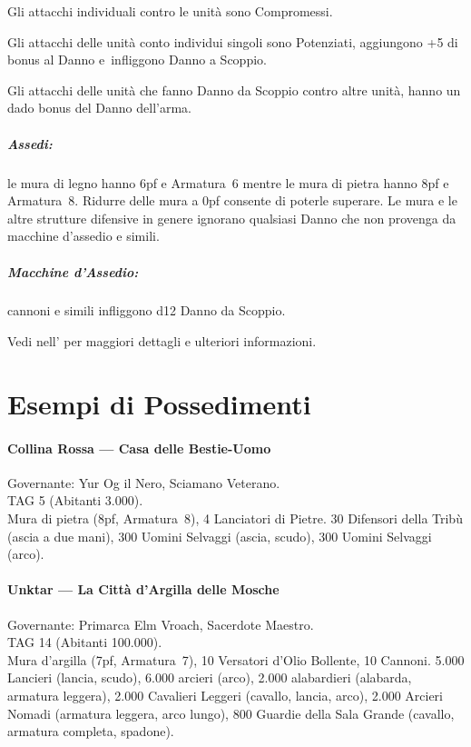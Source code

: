 \documentclass[itdr]{subfiles}
\begin{document}
Gli attacchi individuali contro le unità sono Compromessi.

Gli attacchi delle unità conto individui singoli sono Potenziati, aggiungono +5 di bonus al Danno e~infliggono Danno a Scoppio.

Gli attacchi delle unità che fanno Danno da Scoppio contro altre unità, hanno un dado bonus del Danno dell’arma.

\subparagraph{Assedi:} le mura di legno hanno 6pf e Armatura~6 mentre le mura di pietra hanno 8pf e Armatura~8. Ridurre delle mura a 0pf consente di poterle superare. Le mura e le altre strutture difensive in genere ignorano qualsiasi Danno che non provenga da macchine d’assedio e simili.

\subparagraph{Macchine d’Assedio:} cannoni e simili infliggono d12 Danno da Scoppio.

\begin{dbox}
	Vedi \textbf{} nell'\textbf{} per maggiori dettagli e ulteriori informazioni.
\end{dbox}

\vfill

\section{Esempi di Possedimenti}

\paragraph{Collina Rossa --- Casa delle Bestie-Uomo}
Governante: Yur Og il Nero, Sciamano Veterano.\\
TAG 5 (Abitanti 3.000).\\
Mura di pietra (8pf, Armatura~8), 4 Lanciatori di Pietre. 30 Difensori della Tribù (ascia a due mani), 300 Uomini Selvaggi (ascia, scudo), 300 Uomini Selvaggi (arco).

\paragraph{Unktar --- La Città d’Argilla delle Mosche}
Governante: Primarca Elm Vroach, Sacerdote Maestro.\\
TAG 14 (Abitanti 100.000).\\
Mura d’argilla (7pf, Armatura~7), 10 Versatori d’Olio Bollente, 10 Cannoni. 5.000 Lancieri (lancia, scudo), 6.000 arcieri (arco), 2.000 alabardieri (alabarda, armatura leggera), 2.000 Cavalieri Leggeri (cavallo, lancia, arco), 2.000 Arcieri Nomadi (armatura leggera, arco lungo), 800 Guardie della Sala Grande (cavallo, armatura completa, spadone).

\vfill
\end{document}
